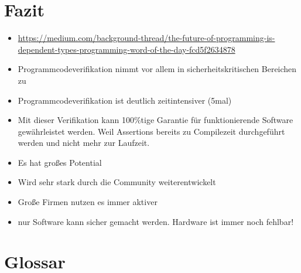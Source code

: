 \section{Fazit}
\begin{itemize}
	\item \url{https://medium.com/background-thread/the-future-of-programming-is-dependent-types-programming-word-of-the-day-fcd5f2634878}
	\item Programmcodeverifikation nimmt vor allem in sicherheitskritischen Bereichen zu
	\item Programmcodeverifikation ist deutlich zeitintensiver (5mal)
	\item Mit dieser Verifikation kann 100\%tige Garantie für funktionierende Software gewährleistet werden. Weil Assertions bereits zu Compilezeit durchgeführt werden und nicht mehr zur Laufzeit.
	\item Es hat großes Potential
	\item Wird sehr stark durch die Community weiterentwickelt
	\item Große Firmen nutzen es immer aktiver
	\item nur Software kann sicher gemacht werden. Hardware ist immer noch fehlbar!
\end{itemize}

\section{Glossar}


